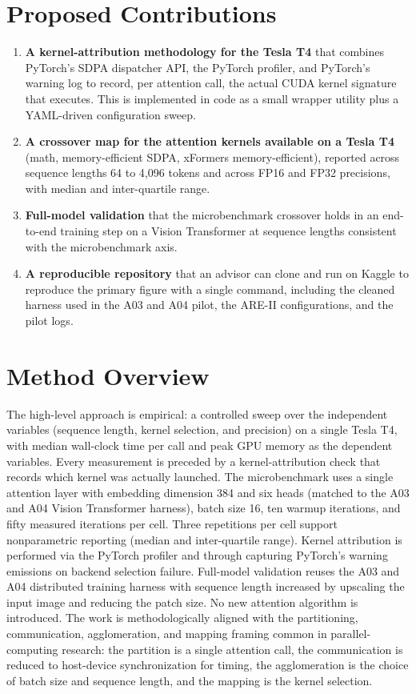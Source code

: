 \documentclass[11pt]{article}
\begin{document}
\section{Proposed Contributions}
\begin{enumerate}[leftmargin=2em]
    \item \textbf{A kernel-attribution methodology for the Tesla T4} that combines PyTorch's SDPA dispatcher API, the PyTorch profiler, and PyTorch's warning log to record, per attention call, the actual CUDA kernel signature that executes. This is implemented in code as a small wrapper utility plus a YAML-driven configuration sweep.
    \item \textbf{A crossover map for the attention kernels available on a Tesla T4} (math, memory-efficient SDPA, xFormers memory-efficient), reported across sequence lengths 64 to 4{,}096 tokens and across FP16 and FP32 precisions, with median and inter-quartile range.
    \item \textbf{Full-model validation} that the microbenchmark crossover holds in an end-to-end training step on a Vision Transformer at sequence lengths consistent with the microbenchmark axis.
    \item \textbf{A reproducible repository} that an advisor can clone and run on Kaggle to reproduce the primary figure with a single command, including the cleaned harness used in the A03 and A04 pilot, the ARE-II configurations, and the pilot logs.
\end{enumerate}

\section{Method Overview}

The high-level approach is empirical: a controlled sweep over the independent variables (sequence length, kernel selection, and precision) on a single Tesla T4, with median wall-clock time per call and peak GPU memory as the dependent variables. Every measurement is preceded by a kernel-attribution check that records which kernel was actually launched. The microbenchmark uses a single attention layer with embedding dimension 384 and six heads (matched to the A03 and A04 Vision Transformer harness), batch size 16, ten warmup iterations, and fifty measured iterations per cell. Three repetitions per cell support nonparametric reporting (median and inter-quartile range). Kernel attribution is performed via the PyTorch profiler and through capturing PyTorch's warning emissions on backend selection failure. Full-model validation reuses the A03 and A04 distributed training harness with sequence length increased by upscaling the input image and reducing the patch size. No new attention algorithm is introduced. The work is methodologically aligned with the partitioning, communication, agglomeration, and mapping framing common in parallel-computing research: the partition is a single attention call, the communication is reduced to host-device synchronization for timing, the agglomeration is the choice of batch size and sequence length, and the mapping is the kernel selection.
\end{document}
